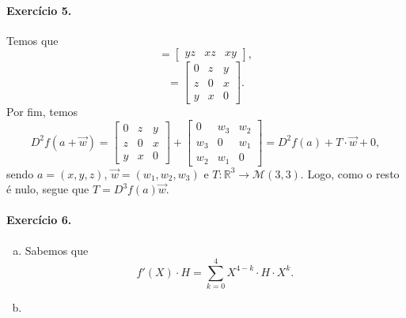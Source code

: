 \documentclass[12pt,a4paper]{article}
\newcommand{\R}{\mathbb{R}}
\begin{document}
\paragraph{Exercício 5.}
%
Temos que
%
\begin{equation*}
    [f'(x,y,z)] = 
    \begin{bmatrix}
        yz & xz & xy
    \end{bmatrix},
\end{equation*}
%
\begin{equation*}
    [f''(x,y,z)] =
    \begin{bmatrix}
        0 & z & y \\
        z & 0 & x \\
        y & x & 0
    \end{bmatrix}.
\end{equation*}
%
Por fim, temos
%
\begin{equation*}
    D^2f(a + \vec{w}) = 
    \begin{bmatrix}
        0 & z & y \\
        z & 0 & x \\
        y & x & 0
    \end{bmatrix}
    +
    \begin{bmatrix}
        0 & w_3 & w_2 \\
        w_3 & 0 & w_1 \\
        w_2 & w_1 & 0
    \end{bmatrix}
    =
    D^2f(a) + T\cdot\vec{w} + 0,
\end{equation*}
%
sendo $a = (x, y, z)$, $\vec{w} = (w_1, w_2, w_3)$ e $T: \R^3 \to \mathcal{M}(3,3)$. Logo,
como o resto é nulo, segue que $T = D^3f(a)\vec{w}$. 
%
\paragraph{Exercício 6.}
%
\begin{enumerate}[a)]
    \item Sabemos que
    \[
    f'(X)\cdot H = \sum_{k=0}^4 X^{4-k} \cdot H \cdot X^k.
    \]
    \item
\end{enumerate}
%
\end{document}
